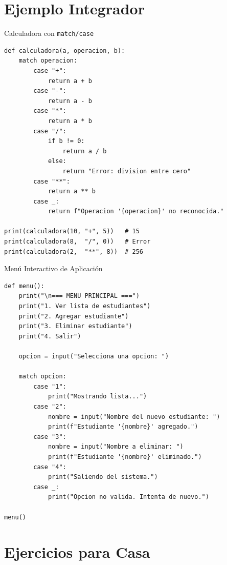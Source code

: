 \documentclass[aspectratio=169,xcolor=dvipsnames]{beamer}
\begin{document}
\section{Ejemplo Integrador}

\begin{frame}[fragile]{Calculadora con \texttt{match/case}}
\begin{lstlisting}[style=PythonStyle]
def calculadora(a, operacion, b):
    match operacion:
        case "+":
            return a + b
        case "-":
            return a - b
        case "*":
            return a * b
        case "/":
            if b != 0:
                return a / b
            else:
                return "Error: division entre cero"
        case "**":
            return a ** b
        case _:
            return f"Operacion '{operacion}' no reconocida."

print(calculadora(10, "+", 5))   # 15
print(calculadora(8,  "/", 0))   # Error
print(calculadora(2,  "**", 8))  # 256
\end{lstlisting}
\end{frame}

\begin{frame}[fragile]{Menú Interactivo de Aplicación}
\begin{lstlisting}[style=PythonStyle]
def menu():
    print("\n=== MENU PRINCIPAL ===")
    print("1. Ver lista de estudiantes")
    print("2. Agregar estudiante")
    print("3. Eliminar estudiante")
    print("4. Salir")

    opcion = input("Selecciona una opcion: ")

    match opcion:
        case "1":
            print("Mostrando lista...")
        case "2":
            nombre = input("Nombre del nuevo estudiante: ")
            print(f"Estudiante '{nombre}' agregado.")
        case "3":
            nombre = input("Nombre a eliminar: ")
            print(f"Estudiante '{nombre}' eliminado.")
        case "4":
            print("Saliendo del sistema.")
        case _:
            print("Opcion no valida. Intenta de nuevo.")

menu()
\end{lstlisting}
\end{frame}

\section{Ejercicios para Casa}
\end{document}
